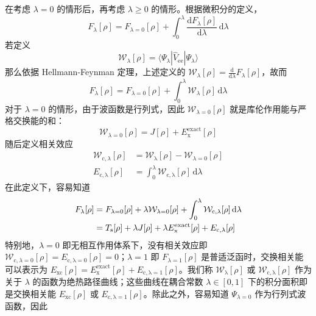 在考虑 $\lambda=0$ 的情形后，再考虑 $\lambda \geqslant 0$ 的情形。根据微积分的定义，
\begin{equation}
  F_\lambda [\rho] = F_{\lambda=0} [\rho] + \int_0^\lambda \frac{\mathrm{d} F_{\lambda} [\rho]}{\mathrm{d} \lambda} \, \mathrm{d} \lambda
\end{equation}
若定义
\begin{equation}
  \mathcal{W}_\lambda [\rho] = \langle \Psi_\lambda | \hat V_\mathrm{ee} | \Psi_\lambda \rangle
\end{equation}
那么依据 Hellmann-Feynman 定理，上述定义的 $\mathcal{W}_\lambda [\rho] = \frac{\mathrm{d}}{\mathrm{d} \lambda} F_\lambda [\rho]$，故而
\begin{equation}
  F_\lambda [\rho] = F_{\lambda=0} [\rho] + \int_0^\lambda \mathcal{W}_{\lambda} [\rho] \, \mathrm{d} \lambda
\end{equation}
对于 $\lambda=0$ 的情形，由于波函数是行列式，因此 $\mathcal{W}_{\lambda=0} [\rho]$ 就是库伦作用能与严格交换能的和：
\begin{equation}
  \mathcal{W}_{\lambda=0} [\rho] = J[\rho] + E_\mathrm{x}^\mathrm{exact} [\rho]
\end{equation}
随后定义相关效应
\begin{align}
  \mathcal{W}_{\mathrm{c}, \lambda} [\rho] &= \mathcal{W}_\mathrm{\lambda} [\rho] - \mathcal{W}_{\lambda=0} [\rho] \\
  \label{eq.E-c-lambda}
  E_\mathrm{c, \lambda} [\rho] &= \int_0^\lambda \mathcal{W}_\mathrm{c, \lambda} [\rho] \, \mathrm{d} \lambda
\end{align}
在此定义下，容易知道
\begin{align}
  \label{eq.F-with-lambda}
  F_\lambda [\rho] &= F_{\lambda=0} [\rho] + \lambda \mathcal{W}_{\lambda=0} [\rho] + \int_0^\lambda \mathcal{W}_\mathrm{c, \lambda} [\rho] \, \mathrm{d} \lambda \notag\\
  &= T_\mathrm{s} [\rho] + \lambda J[\rho] + \lambda E_\mathrm{x}^\mathrm{exact} [\rho] + E_\mathrm{c, \lambda} [\rho]
\end{align}
特别地，$\lambda = 0$ 即无相互作用体系下，没有相关效应即 $\mathcal{W}_{\mathrm{c}, \lambda=0} [\rho] = E_\mathrm{c, \lambda=0} [\rho] = 0$；$\lambda = 1$ 即 $F_{\lambda=1} [\rho]$ 是普适泛函时，交换相关能可以表示为 $E_\mathrm{xc} [\rho] = E_\mathrm{x}^\mathrm{exact} [\rho] + E_\mathrm{c, \lambda=1} [\rho]$。我们称 $\mathcal{W}_\mathrm{\lambda}[\rho]$ 或 $\mathcal{W}_\mathrm{c, \lambda}[\rho]$ 作为关于 $\lambda$ 的函数为绝热路径曲线；这些曲线在耦合常数 $\lambda \in [0, 1]$ 下的积分面积即是交换相关能 $E_\mathrm{xc}[\rho]$ 或 $E_\mathrm{c, \lambda=1}[\rho]$。除此之外，容易知道 $\Psi_{\lambda=0}$ 作为行列式波函数，因此
